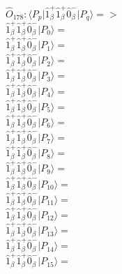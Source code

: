 \documentclass[14pt]{article}
\begin{document}
    $\hat{O}_{178}:  \langle{P_p}\vert \hat{1}_{\beta}^{+}\hat{1}_{\beta}^{+}\hat{0}_{\beta}^{-} \vert{P_q}\rangle => $ \\ 
    $ \hat{1}_{\beta}^{+}\hat{1}_{\beta}^{+}\hat{0}_{\beta}^{-} \vert{P_{0}}\rangle =  $ \\ 
    $ \hat{1}_{\beta}^{+}\hat{1}_{\beta}^{+}\hat{0}_{\beta}^{-} \vert{P_{1}}\rangle =  $ \\ 
    $ \hat{1}_{\beta}^{+}\hat{1}_{\beta}^{+}\hat{0}_{\beta}^{-} \vert{P_{2}}\rangle =  $ \\ 
    $ \hat{1}_{\beta}^{+}\hat{1}_{\beta}^{+}\hat{0}_{\beta}^{-} \vert{P_{3}}\rangle =  $ \\ 
    $ \hat{1}_{\beta}^{+}\hat{1}_{\beta}^{+}\hat{0}_{\beta}^{-} \vert{P_{4}}\rangle =  $ \\ 
    $ \hat{1}_{\beta}^{+}\hat{1}_{\beta}^{+}\hat{0}_{\beta}^{-} \vert{P_{5}}\rangle =  $ \\ 
    $ \hat{1}_{\beta}^{+}\hat{1}_{\beta}^{+}\hat{0}_{\beta}^{-} \vert{P_{6}}\rangle =  $ \\ 
    $ \hat{1}_{\beta}^{+}\hat{1}_{\beta}^{+}\hat{0}_{\beta}^{-} \vert{P_{7}}\rangle =  $ \\ 
    $ \hat{1}_{\beta}^{+}\hat{1}_{\beta}^{+}\hat{0}_{\beta}^{-} \vert{P_{8}}\rangle =  $ \\ 
    $ \hat{1}_{\beta}^{+}\hat{1}_{\beta}^{+}\hat{0}_{\beta}^{-} \vert{P_{9}}\rangle =  $ \\ 
    $ \hat{1}_{\beta}^{+}\hat{1}_{\beta}^{+}\hat{0}_{\beta}^{-} \vert{P_{10}}\rangle =  $ \\ 
    $ \hat{1}_{\beta}^{+}\hat{1}_{\beta}^{+}\hat{0}_{\beta}^{-} \vert{P_{11}}\rangle =  $ \\ 
    $ \hat{1}_{\beta}^{+}\hat{1}_{\beta}^{+}\hat{0}_{\beta}^{-} \vert{P_{12}}\rangle =  $ \\ 
    $ \hat{1}_{\beta}^{+}\hat{1}_{\beta}^{+}\hat{0}_{\beta}^{-} \vert{P_{13}}\rangle =  $ \\ 
    $ \hat{1}_{\beta}^{+}\hat{1}_{\beta}^{+}\hat{0}_{\beta}^{-} \vert{P_{14}}\rangle =  $ \\ 
    $ \hat{1}_{\beta}^{+}\hat{1}_{\beta}^{+}\hat{0}_{\beta}^{-} \vert{P_{15}}\rangle =  $ \\ 
    
\end{document}
